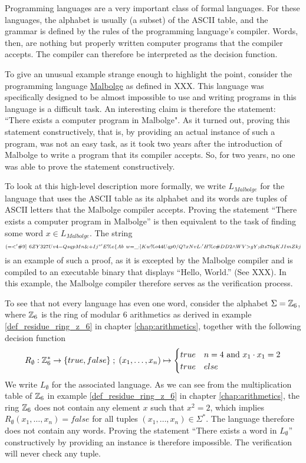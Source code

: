 \begin{example}Programming languages are a very important class of formal languages. For these languages, the alphabet is usually (a subset) of the ASCII table, and the grammar is defined by the rules of the programming language's compiler. Words, then, are nothing but properly written computer programs that the compiler accepts. The compiler can therefore be interpreted as the decision function.

To give an unusual example strange enough to highlight the point, consider the programming language \href{https://en.wikipedia.org/wiki/Malbolge}{Malbolge} as defined in XXX. This language was specifically designed to be almost impossible to use and writing programs in this language is a difficult task. An interesting claim is therefore the statement: ``There exists a computer program in Malbolge". As it turned out, proving this statement constructively, that is, by providing an actual instance of such a program, was not an easy task, as it took two years after the introduction of Malbolge to write a program that its compiler accepts. So, for two years, no one was able to prove the statement constructively.

To look at this high-level description more formally, we write $L_{Malbolge}$ for the language that uses the ASCII table as its alphabet and its words are tuples of ASCII letters that the Malbolge compiler accepts. Proving the statement ``There exists a computer program in Malbolge'' is then equivalent to the task of finding some word $x\in L_{Malbolge}$. The string
$$
\scriptstyle (=<'\#9]~6ZY327Uv4-QsqpMn\&+Ij"'E\%e\{Ab~w=\_:]Kw\%o44Uqp0/Q?xNvL:'H\%c\#DD2\wedge WV>gY;dts76qKJImZkj
$$
is an example of such a proof, as it is excepted by the Malbolge compiler and is compiled to an executable binary that displays ``Hello, World.'' (See XXX). In this example, the Malbolge compiler therefore serves as the verification process.
\end{example}
\begin{example} To see that not every language has even one word, consider the alphabet $\Sigma = \mathbb{Z}_6$, where $\mathbb{Z}_6$ is the ring of modular $6$ arithmetics as derived in example \ref{def_residue_ring_z_6} in chapter \ref{chap:arithmetics}, together with the following decision function 
$$
R_{\emptyset} : \mathbb{Z}_{6}^* \to \{true, false\}\;;\;
(x_1,\ldots,x_n) \mapsto
\begin{cases}
true & n=4 \text{ and } x_1\cdot x_1 = 2\\
true & else
\end{cases}
$$
We write $L_\emptyset$ for the associated language. As we can see from the multiplication table of $\mathbb{Z}_6$ in example \ref{def_residue_ring_z_6} in chapter \ref{chap:arithmetics}, the ring $\mathbb{Z}_6$ does not contain any element $x$ such that $x^2 =2$, which implies $R_{\emptyset}(x_1,\ldots,x_n)=false$ for all tuples $(x_1,\ldots,x_n)\in \Sigma^*$. The language therefore does not contain any words. Proving the statement ``There exists a word in $L_\emptyset$'' constructively by providing an instance is therefore impossible. The verification will never check any tuple.
\end{example}
